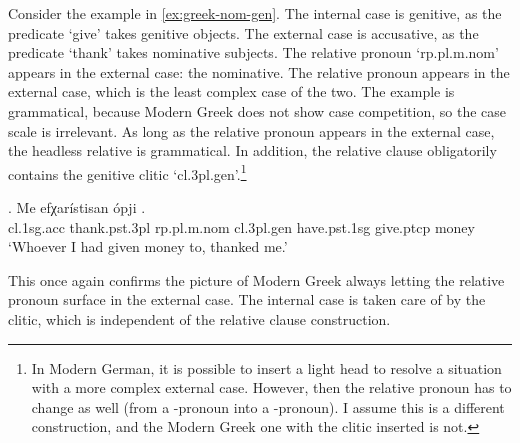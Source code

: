 Consider the example in \ref{ex:greek-nom-gen}.
The internal case is genitive, as the predicate  `give' takes genitive objects.
The external case is accusative, as the predicate  `thank' takes nominative subjects.
The relative pronoun  `\ac{rp}.\ac{pl}.\ac{m}.\ac{nom}' appears in the external case: the nominative.
The relative pronoun appears in the external case, which is the least complex case of the two. The example is grammatical, because Modern Greek does not show case competition, so the case scale is irrelevant. As long as the relative pronoun appears in the external case, the headless relative is grammatical. In addition, the relative clause obligatorily contains the genitive clitic  `\ac{cl}.3\ac{pl}.\ac{gen}'.\footnote{
In Modern German, it is possible to insert a light head to resolve a situation with a more complex external case. However, then the relative pronoun has to change as well (from a -pronoun into a -pronoun). I assume this is a different construction, and the Modern Greek one with the clitic inserted is not.
}

\exg. Me efχarístisan ópji    .\\
 \ac{cl}.1\ac{sg}.\ac{acc} thank.\ac{pst}.3\ac{pl}\scsub{[nom]} \ac{rp}.\ac{pl}.\ac{m}.\ac{nom} \ac{cl}.3\ac{pl}.\ac{gen} have.\ac{pst}.1\ac{sg} give.\ac{ptcp}\scsub{[gen]} money\\
 `Whoever I had given money to, thanked me.'\label{ex:greek-nom-gen}

This once again confirms the picture of Modern Greek always letting the relative pronoun surface in the external case. The internal case is taken care of by the clitic, which is independent of the relative clause construction.

